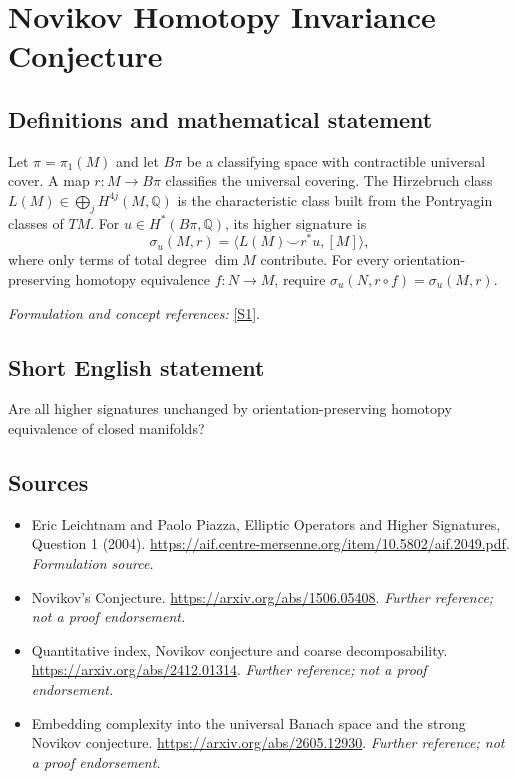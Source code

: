 \documentclass[11pt]{article}
\begin{document}
\section*{\texorpdfstring{Novikov Homotopy Invariance Conjecture}{Novikov Homotopy Invariance Conjecture}}\label{statement}
\subsection{Definitions and mathematical statement}
Let $\pi=\pi_1(M)$ and let $B\pi$ be a classifying space with contractible universal cover. A map $r:M\to B\pi$ classifies the universal covering. The Hirzebruch class $L(M)\in\bigoplus_jH^{4j}(M,{\mathbb{Q}})$ is the characteristic class built from the Pontryagin classes of $TM$. For $u\in H^*(B\pi,{\mathbb{Q}})$, its higher signature is
\[
 \sigma_u(M,r)=\langle L(M)\smile r^*u,[M]\rangle,
\]
where only terms of total degree $\dim M$ contribute. For every orientation-preserving homotopy equivalence $f:N\to M$, require $\sigma_u(N,r\circ f)=\sigma_u(M,r)$.
\par\smallskip\textit{Formulation and concept references:} \href{https://aif.centre-mersenne.org/item/10.5802/aif.2049.pdf}{[S1]}.

\subsection{Short English statement}
Are all higher signatures unchanged by orientation-preserving homotopy equivalence of closed manifolds?
\subsection{Sources}
\begin{itemize}
\item[S1]Eric Leichtnam and Paolo Piazza, Elliptic Operators and Higher Signatures, Question 1 (2004).
\url{https://aif.centre-mersenne.org/item/10.5802/aif.2049.pdf}.
\textit{Formulation source.}
\item[S2]Novikov's Conjecture.
\url{https://arxiv.org/abs/1506.05408}.
\textit{Further reference; not a proof endorsement.}
\item[S3]Quantitative index, Novikov conjecture and coarse decomposability.
\url{https://arxiv.org/abs/2412.01314}.
\textit{Further reference; not a proof endorsement.}
\item[S4]Embedding complexity into the universal Banach space and the strong Novikov conjecture.
\url{https://arxiv.org/abs/2605.12930}.
\textit{Further reference; not a proof endorsement.}
\end{itemize}
\end{document}
